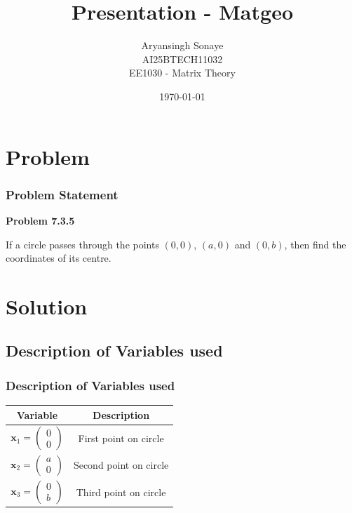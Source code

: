\documentclass{beamer}
\title{Presentation - Matgeo}
\author{Aryansingh Sonaye \\
AI25BTECH11032 \\
EE1030 - Matrix Theory}
\date{\today}
\theoremstyle{remark}
\newcommand{\myvec}[1]{\ensuremath{\begin{pmatrix}#1\end{pmatrix}}}
\let\vec\mathbf
\numberwithin{equation}{section}
\begin{document}
\begin{frame}
\titlepage
\end{frame}

\section{Problem}
\begin{frame}
\frametitle{Problem Statement}
\textbf{Problem 7.3.5}

If a circle passes through the points $(0,0)$, $(a,0)$ and $(0,b)$, then find the coordinates of its centre.


\end{frame}

\section{Solution}
\subsection{Description of Variables used}
\begin{frame}
\frametitle{Description of Variables used}
\begin{table}[H]
\centering
\begin{tabular}{|c|c|}
\hline
Variable & Description \\
\hline
$\vec{x}_1 = \myvec{0 \\ 0}$ & First point on circle \\
\hline
$\vec{x}_2 = \myvec{a \\ 0}$ & Second point on circle \\
\hline
$\vec{x}_3 = \myvec{0 \\ b}$ & Third point on circle \\
\hline
\end{tabular}
\end{table}


\end{frame}
\end{document}
